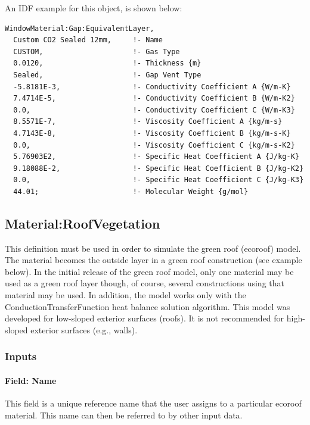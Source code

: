 An IDF example for this object, is shown below:

\begin{lstlisting}
WindowMaterial:Gap:EquivalentLayer,
  Custom CO2 Sealed 12mm,     !- Name
  CUSTOM,                     !- Gas Type
  0.0120,                     !- Thickness {m}
  Sealed,                     !- Gap Vent Type
  -5.8181E-3,                 !- Conductivity Coefficient A {W/m-K}
  7.4714E-5,                  !- Conductivity Coefficient B {W/m-K2}
  0.0,                        !- Conductivity Coefficient C {W/m-K3}
  8.5571E-7,                  !- Viscosity Coefficient A {kg/m-s}
  4.7143E-8,                  !- Viscosity Coefficient B {kg/m-s-K}
  0.0,                        !- Viscosity Coefficient C {kg/m-s-K2}
  5.76903E2,                  !- Specific Heat Coefficient A {J/kg-K}
  9.18088E-2,                 !- Specific Heat Coefficient B {J/kg-K2}
  0.0,                        !- Specific Heat Coefficient C {J/kg-K3}
  44.01;                      !- Molecular Weight {g/mol}
\end{lstlisting}

\subsection{Material:RoofVegetation}\label{materialroofvegetation}

This definition must be used in order to simulate the green roof (ecoroof) model. The material becomes the outside layer in a green roof construction (see example below). In the initial release of the green roof model, only one material may be used as a green roof layer though, of course, several constructions using that material may be used. In addition, the model works only with the ConductionTransferFunction heat balance solution algorithm. This model was developed for low-sloped exterior surfaces (roofs). It is not recommended for high-sloped exterior surfaces (e.g., walls).

\subsubsection{Inputs}\label{inputs-32-000}

\paragraph{Field: Name}\label{field-name-26-002}

This field is a unique reference name that the user assigns to a particular ecoroof material. This name can then be referred to by other input data.

